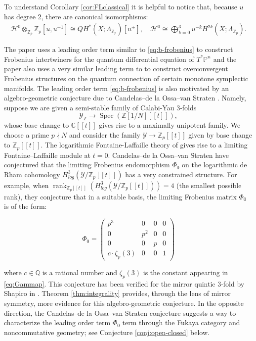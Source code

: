 \documentclass[reqno]{amsart}
\numberwithin{equation}{section}
\numberwithin{equation}{section}
\numberwithin{equation}{section}
\theoremstyle{definition}
\theoremstyle{remark}
\theoremstyle{remark}
\begin{document}
 To understand Corollary \ref{cor:FLclassical} it is helpful to notice that, because $u$ has degree 2, there are canonical isomorphisms: \begin{align} \mathcal{H}^0\otimes_{\mathbb{Z}_p} \mathbb{Z}_p[u,u^{-1}] \cong QH^*(X;\Lambda_{{\mathbb{Z}_p}})[u^{\pm}], \quad \mathcal{H}^0 \cong \bigoplus_{k=0}^3 u^{-k}H^{2k}(X;\Lambda_{{\mathbb{Z}_p}}).  \end{align} 

The paper \cite{smirnov24} uses a leading order term similar to \eqref{eq:b-frobenius} to construct Frobenius intertwiners for the quantum differential equation of $T^*\mathbb{P}^n$ and the paper \cite{bai2025p} also uses a very similar leading term to to construct overconvergent Frobenius structures on the quantum connection of certain monotone symplectic manifolds. The leading order term \eqref{eq:b-frobenius} is also motivated by an algebro-geometric conjecture due to Candelas--de la Ossa--van Straten \cite[\S 4.4]{candelas}.  Namely, suppose we are given a semi-stable family of Calabi-Yau 3-folds $$ \mathcal{Y}_\mathbb{Z} \to \operatorname{Spec}(\mathbb{Z}[1/N][\![t]\!]),$$
whose base change to $\mathbb{C}[\![t]\!]$ gives rise to a maximally unipotent family. We choose a prime $p \nmid N$ and consider the  family $\mathcal{Y} \to \mathbb{Z}_p[\![t]\!]$ given by base change to $\mathbb{Z}_p[\![t]\!]$. The logarithmic Fontaine-Laffaille theory of \cite{Faltings1989} gives rise to a limiting Fontaine--Laffaille module at $t=0$. Candelas--de la Ossa--van Straten have conjectured  that the limiting Frobenius endomorphism $\Phi_0$ on the logarithmic de Rham cohomology $H^3_{log}(\mathcal{Y}/\mathbb{Z}_p[\![t]\!])$ has a very constrained structure. For example, when $\operatorname{rank}_{\mathbb{Z}_p[\![t]\!]}(H^3_{log}(\mathcal{Y}/\mathbb{Z}_p[\![t]\!]))=4$ (the smallest possible rank), they conjecture that in a suitable basis, the limiting Frobenius matrix $\Phi_0$ is of the form:


\[
\Phi_0 = \begin{pmatrix} 
p^3 & 0 & 0 & 0 \\ 
0 & p^2 & 0 & 0 \\ 
0 & 0 & p & 0 \\ 
c \cdot \zeta_p(3)  & 0 & 0 & 1
\end{pmatrix}
\]

where $c \in \mathbb{Q}$ is a rational number and $\zeta_p(3)$ is the constant appearing in \eqref{eq:Gammap}. This conjecture has been verified for the mirror quintic 3-fold by Shapiro in \cite{Schapiro1, Schapiro2}. Theorem \ref{thm:integrality} provides, through the lens of mirror symmetry, more evidence for this algebro-geometric conjecture. In the opposite direction, the Candelas--de la Ossa--van Straten conjecture suggests a way to characterize the leading order term $\Phi_0$ term through the Fukaya category and noncommutative geometry; see Conjecture \ref{conj:open-closed} below.
\end{document}

